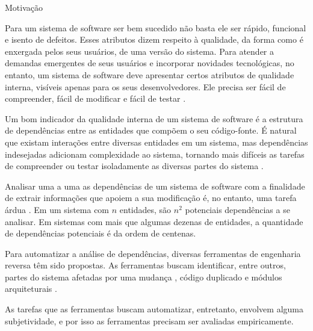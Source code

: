 \begin{section}{Motivação}

		Para um sistema de software ser bem sucedido não basta ele ser rápido, funcional e isento de defeitos. Esses atributos dizem respeito à qualidade, da forma como é enxergada pelos seus usuários, de uma versão do sistema. Para atender a demandas emergentes de seus usuários e incorporar novidades tecnológicas, no entanto, um sistema de software deve apresentar certos atributos de qualidade interna, visíveis apenas para os seus desenvolvedores. Ele precisa ser fácil de compreender, fácil de modificar e fácil de testar \cite{Parnas1994}.

		Um bom indicador da qualidade interna de um sistema de software é a estrutura de dependências entre as entidades que compõem o seu código-fonte. É natural que existam interações entre diversas entidades em um sistema, mas dependências indesejadas adicionam complexidade ao sistema, tornando mais difíceis as tarefas de compreender ou testar isoladamente as diversas partes do sistema \cite{Chidamber1994}. %

		Analisar uma a uma as dependências de um sistema de software com a finalidade de extrair informações que apoiem a sua modificação é, no entanto, uma tarefa árdua \cite{Tonella2007}. Em um sistema com $n$ entidades, são $n^2$ potenciais dependências a se analisar. Em sistemas com mais que algumas dezenas de entidades, a quantidade de dependências potenciais é da ordem de centenas. %
		
		
		Para automatizar a análise de dependências, diversas ferramentas de engenharia reversa têm sido propostas. As ferramentas buscam identificar, entre outros, partes do sistema afetadas por uma mudança \cite{Arnold1993}, código duplicado \cite{Roy2007} e módulos arquiteturais \cite{Maqbool2007}.

	As tarefas que as ferramentas buscam automatizar, entretanto, envolvem alguma subjetividade, e por isso as ferramentas precisam ser avaliadas empiricamente. %
	
	

\end{section}
